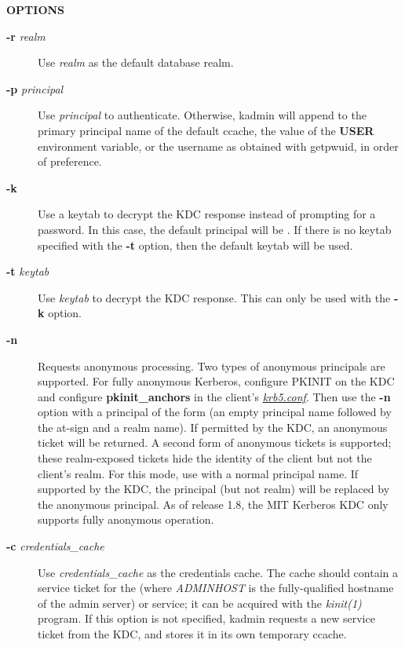 \documentclass[letterpaper,10pt,english]{sphinxmanual}
\begin{document}
\textbf{OPTIONS}
\begin{description}
\item[{\textbf{-r} \emph{realm}}] \leavevmode
Use \emph{realm} as the default database realm.

\item[{\textbf{-p} \emph{principal}}] \leavevmode
Use \emph{principal} to authenticate.  Otherwise, kadmin will append
 to the primary principal name of the default ccache,
the value of the \textbf{USER} environment variable, or the username as
obtained with getpwuid, in order of preference.

\item[{\textbf{-k}}] \leavevmode
Use a keytab to decrypt the KDC response instead of prompting for
a password.  In this case, the default principal will be
.  If there is no keytab specified with the
\textbf{-t} option, then the default keytab will be used.

\item[{\textbf{-t} \emph{keytab}}] \leavevmode
Use \emph{keytab} to decrypt the KDC response.  This can only be used
with the \textbf{-k} option.

\item[{\textbf{-n}}] \leavevmode
Requests anonymous processing.  Two types of anonymous principals
are supported.  For fully anonymous Kerberos, configure PKINIT on
the KDC and configure \textbf{pkinit\_anchors} in the client's
{\hyperref[admin/conf_files/krb5_conf:krb5-conf-5]{\emph{krb5.conf}}}.  Then use the \textbf{-n} option with a principal
of the form  (an empty principal name followed by the
at-sign and a realm name).  If permitted by the KDC, an anonymous
ticket will be returned.  A second form of anonymous tickets is
supported; these realm-exposed tickets hide the identity of the
client but not the client's realm.  For this mode, use  with a normal principal name.  If supported by the KDC, the
principal (but not realm) will be replaced by the anonymous
principal.  As of release 1.8, the MIT Kerberos KDC only supports
fully anonymous operation.

\item[{\textbf{-c} \emph{credentials\_cache}}] \leavevmode
Use \emph{credentials\_cache} as the credentials cache.  The
cache should contain a service ticket for the 
(where \emph{ADMINHOST} is the fully-qualified hostname of the admin
server) or  service; it can be acquired with the
\emph{kinit(1)} program.  If this option is not specified, kadmin
requests a new service ticket from the KDC, and stores it in its
own temporary ccache.


\end{description}
\end{document}
